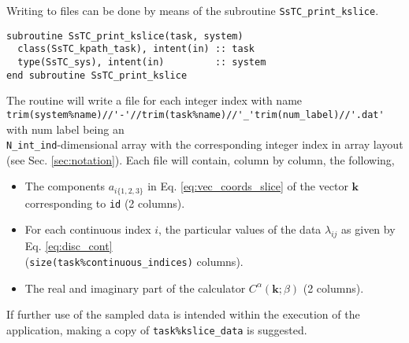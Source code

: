 \documentclass[10pt,a4paper]{article}
\begin{document}
Writing to files can be done by means of the subroutine \verb|SsTC_print_kslice|.
\begin{lstlisting}[caption={Interface of the ``kpath" printer.},captionpos=b]
subroutine SsTC_print_kslice(task, system)
  class(SsTC_kpath_task), intent(in) :: task
  type(SsTC_sys), intent(in)         :: system
end subroutine SsTC_print_kslice
\end{lstlisting}
The routine will write a file for each integer index with name \\ \verb|trim(system%name)//'-'//trim(task%name)//'_'trim(num_label)//'.dat'| with num label being an \\ \verb|N_int_ind|-dimensional array with the corresponding integer index in array layout (see Sec. \ref{sec:notation}). Each file will contain, column by column, the following,
\begin{itemize}
\item The components $a_{i\{1, 2, 3\}}$ in Eq. \eqref{eq:vec_coords_slice} of the vector $\bm{k}$ corresponding to \verb|id| (2 columns).
\item For each continuous index $i$, the particular values of the data $\lambda_{ij}$ as given by Eq. \eqref{eq:disc_cont} \\ (\verb|size(task%continuous_indices)| columns).
\item The real and imaginary part of the calculator $C^{\alpha}(\bm{k};\beta)$ (2 columns).
\end{itemize}
If further use of the sampled data is intended within the execution of the application, making a copy of \verb|task%kslice_data| is suggested.
\end{document}
